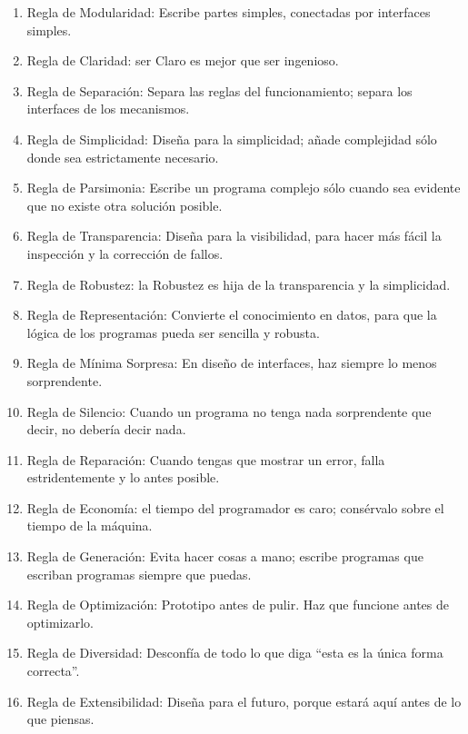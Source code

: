 \begin{enumerate}
\item Regla de Modularidad: Escribe partes simples, conectadas por interfaces simples.
\item Regla de Claridad: ser Claro es mejor que ser ingenioso.
\item Regla de Separación: Separa las reglas del funcionamiento; separa los interfaces de los mecanismos.
\item Regla de Simplicidad: Diseña para la simplicidad; añade complejidad sólo donde sea estrictamente necesario.
\item Regla de Parsimonia: Escribe un programa complejo sólo cuando sea evidente que no existe otra solución posible.
\item Regla de Transparencia: Diseña para la visibilidad, para hacer más fácil la inspección y la corrección de fallos.
\item Regla de Robustez: la Robustez es hija de la transparencia y la simplicidad.
\item Regla de Representación: Convierte el conocimiento en datos, para que la lógica de los programas pueda ser sencilla y robusta.
\item Regla de Mínima Sorpresa: En diseño de interfaces, haz siempre lo menos sorprendente.
\item Regla de Silencio: Cuando un programa no tenga nada sorprendente que decir, no debería decir nada.
\item Regla de Reparación: Cuando tengas que mostrar un error, falla estridentemente y lo antes posible.
\item Regla de Economía: el tiempo del programador es caro; consérvalo sobre el tiempo de la máquina.
\item Regla de Generación: Evita hacer cosas a mano; escribe programas que escriban programas siempre que puedas.
\item Regla de Optimización: Prototipo antes de pulir. Haz que funcione antes de optimizarlo.
\item Regla de Diversidad: Desconfía de todo lo que diga “esta es la única forma correcta”.
\item Regla de Extensibilidad: Diseña para el futuro, porque estará aquí antes de lo que piensas.
\end{enumerate}

